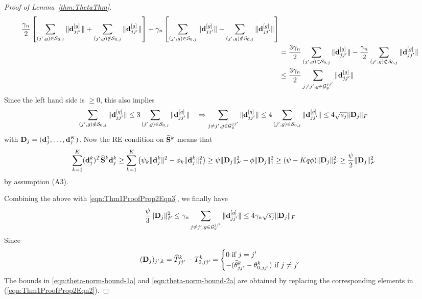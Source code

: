 \begin{proof}[Proof of Lemma~\ref{thm:ThetaThm}]
\begin{align}
\frac{\gamma_n}{2} \left[ \sum_{(j',g) \in {\cal{S}}_{0,j}} \| {\bf{d}}_{jj'}^{[g]} \| + \sum_{(j',g) \notin {\cal{S}}_{0,j}} \| {\bf{d}}_{jj'}^{[g]} \| \right] +
\gamma_n \left[ \sum_{(j',g) \in {\cal{S}}_{0,j}} \| {\bf{d}}_{jj'}^{[g]} \| - \sum_{(j',g) \notin {\cal{S}}_{0,j}} \| {\bf{d}}_{jj'}^{[g]} \| \right] \notag\\
& = \frac{3 \gamma_n}{2} \sum_{(j',g) \in {\cal{S}}_{0,j}} \| {\bf{d}}_{jj'}^{[g]} \| - \frac{\gamma_n}{2} \sum_{(j',g) \notin {\cal{S}}_{0,j}} \| {\bf{d}}_{jj'}^{[g]} \| \notag\\
& \leq \frac{3 \gamma_n}{2} \sum_{j \neq j', g \in {\cal{G}}_y^{jj'}} \| {\bf{d}}_{jj'}^{[g]} \|
\end{align}
%
Since the left hand side is $\geq 0$, this also implies
%
$$
\sum_{(j',g) \notin {\cal{S}}_{0,j}} \| {\bf{d}}_{jj'}^{[g]} \| \leq 3 \sum_{(j',g) \in {\cal{S}}_{0,j}} \| {\bf{d}}_{jj'}^{[g]} \| \quad \Rightarrow
\sum_{j \neq j', g \in {\cal{G}}_y^{jj'}} \| {\bf{d}}_{jj'}^{[g]} \| \leq
4 \sum_{(j',g) \in {\cal{S}}_{0,j}} \| {\bf{d}}_{jj'}^{[g]} \| \leq 4 \sqrt{s_j} \| {\mathbf{D}}_j \|_F
$$
% 
with ${\mathbf{D}}_j = ({\bf{d}}_j^1, \ldots, {\bf{d}}_j^K)$. Now the RE condition on $\widehat {{\mathbf{S}}}^k$ means that
%
$$
\sum_{k=1}^K ({\bf{d}}_j^k)^T \widehat {{\mathbf{S}}}^k {\bf{d}}_j^k \geq 
\sum_{k=1}^K \left( \psi_k \| {\bf{d}}_j^k \|^2 - \phi_k \| {\bf{d}}_j^k \|_1^2 \right) \geq
\psi \| {\mathbf{D}}_j \|_F^2 - \phi \| {\mathbf{D}}_j \|_1^2 \geq 
(\psi - Kq \phi ) \| {\mathbf{D}}_j \|_F^2 \geq \frac{\psi}{2}  \| {\mathbf{D}}_j \|_F^2
$$
%
by assumption (A3).

Combining the above with \eqref{eqn:Thm1ProofProp2Eqn3}, we finally have
%
\begin{align}\label{eqn:Thm1ProofProp2Eqn2}
\frac{\psi}{3} \| {\mathbf{D}}_j \|_F^2 & \leq
\gamma_n \sum_{j \neq j', g \in {\cal{G}}_y^{jj'}} \| {\bf{d}}_{jj'}^{[g]} \| \leq
4 \gamma_n \sqrt{s_j} \| {\mathbf{D}}_j\|_F
\end{align}
%
Since
%
$$
({\mathbf{D}}_j)_{j',k} = \widehat T_{jj'}^k - T_{0,jj'}^k = \begin{cases}
0 \text{ if } j = j'\\
-(\widehat \theta_{jj'}^k - \theta_{0,jj'}^k ) \text{ if } j \neq j'
\end{cases}
$$
%
The bounds in \eqref{eqn:theta-norm-bound-1a} and \eqref{eqn:theta-norm-bound-2a} are obtained by replacing the corresponding elements in (\ref{eqn:Thm1ProofProp2Eqn2}).


\end{proof}
